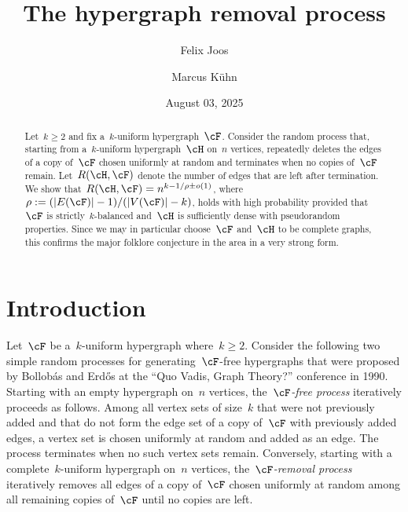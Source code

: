 \documentclass[11pt]{amsart}
\title[The hypergraph removal process]{The hypergraph removal process}
\author[F.~Joos]{Felix Joos}
\author[M.~K\"uhn]{Marcus K\"uhn}
\date{August 03, 2025}
\DeclarePairedDelimiter{\abs}{\lvert}{\rvert}
\theoremstyle{definition}
\numberwithin{equation}{section}
\begin{document}
	
	\begin{abstract}
		Let~$k\geq 2$ and fix a~$k$-uniform hypergraph~$\cF$.
		Consider the random process that, starting from a~$k$-uniform hypergraph~$\cH$ on~$n$ vertices, repeatedly deletes the edges of a copy of~$\cF$ chosen uniformly at random and terminates when no copies of~$\cF$ remain.
		Let~$R(\cH,\cF)$ denote the number of edges that are left after termination.
		We show that~$R(\cH,\cF)=n^{k-1/\rho\pm o(1)}$, where $\rho:=(\abs{E(\cF)}-1)/(\abs{V(\cF)}-k)$, holds with high probability provided that~$\cF$ is strictly~$k$-balanced and~$\cH$ is sufficiently dense with pseudorandom properties.
		Since we may in particular choose~$\cF$ and~$\cH$ to be complete graphs, this confirms the major folklore conjecture in the area in a very strong form.
	\end{abstract}


	\maketitle




	
	\section{Introduction}\label{section: introduction}
	
	Let~$\cF$ be a~$k$-uniform hypergraph where~$k\geq 2$.
	Consider the following two simple random processes for generating~$\cF$-free hypergraphs that were proposed by Bollob\'as and Erd\H{o}s at the \enquote{Quo Vadis, Graph Theory?} conference in 1990.
	Starting with an empty hypergraph on~$n$ vertices, the~\emph{$\cF$-free process} iteratively proceeds as follows.
	Among all vertex sets of size~$k$ that were not previously added and that do not form the edge set of a copy of~$\cF$ with previously added edges, a vertex set is chosen uniformly at random and added as an edge.
	The process terminates when no such vertex sets remain.
	Conversely, starting with a complete~$k$-uniform hypergraph on~$n$ vertices, the~\emph{$\cF$-removal process} iteratively removes all edges of a copy of~$\cF$ chosen uniformly at random among all remaining copies of~$\cF$ until no copies are left.
	
\end{document}
